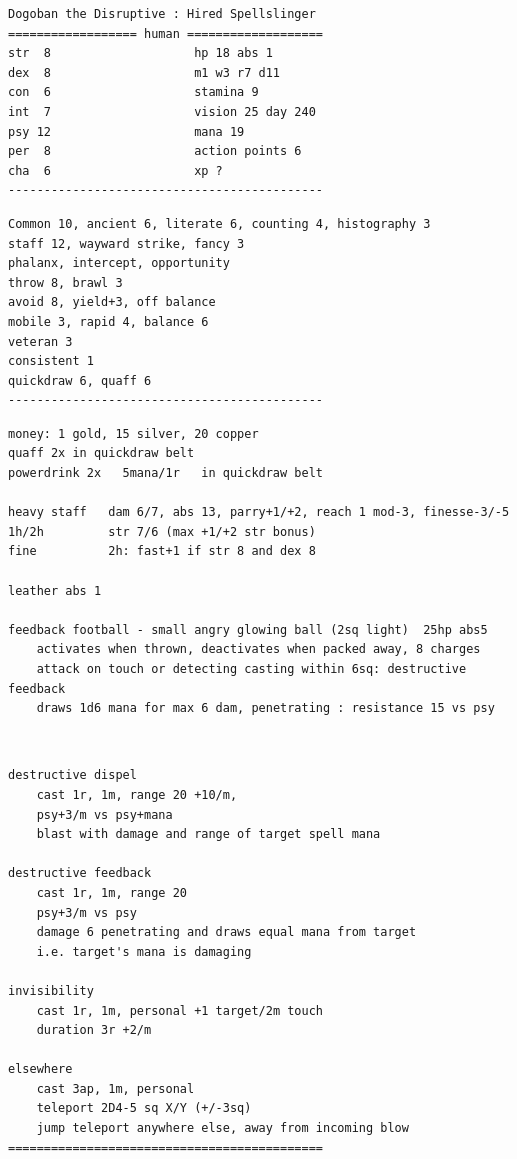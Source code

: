 \small \begin{samepage} \begin{verbatim}
Dogoban the Disruptive : Hired Spellslinger
================== human ===================
str  8                    hp 18 abs 1
dex  8                    m1 w3 r7 d11
con  6                    stamina 9
int  7                    vision 25 day 240
psy 12                    mana 19
per  8                    action points 6
cha  6                    xp ?
--------------------------------------------
\end{verbatim} \goodbreak \begin{verbatim}
Common 10, ancient 6, literate 6, counting 4, histography 3
staff 12, wayward strike, fancy 3
phalanx, intercept, opportunity
throw 8, brawl 3
avoid 8, yield+3, off balance
mobile 3, rapid 4, balance 6
veteran 3
consistent 1
quickdraw 6, quaff 6
--------------------------------------------
\end{verbatim} \goodbreak \begin{verbatim}
money: 1 gold, 15 silver, 20 copper
quaff 2x in quickdraw belt
powerdrink 2x   5mana/1r   in quickdraw belt

heavy staff   dam 6/7, abs 13, parry+1/+2, reach 1 mod-3, finesse-3/-5
1h/2h         str 7/6 (max +1/+2 str bonus)
fine          2h: fast+1 if str 8 and dex 8

leather abs 1

feedback football - small angry glowing ball (2sq light)  25hp abs5
    activates when thrown, deactivates when packed away, 8 charges
    attack on touch or detecting casting within 6sq: destructive feedback
    draws 1d6 mana for max 6 dam, penetrating : resistance 15 vs psy
\end{verbatim} \end{samepage} \ \goodbreak \begin{samepage} \begin{verbatim}
destructive dispel
    cast 1r, 1m, range 20 +10/m, 
    psy+3/m vs psy+mana
    blast with damage and range of target spell mana

destructive feedback
    cast 1r, 1m, range 20
    psy+3/m vs psy
    damage 6 penetrating and draws equal mana from target
    i.e. target's mana is damaging

invisibility
    cast 1r, 1m, personal +1 target/2m touch
    duration 3r +2/m

elsewhere
    cast 3ap, 1m, personal
    teleport 2D4-5 sq X/Y (+/-3sq)
    jump teleport anywhere else, away from incoming blow
============================================
\end{verbatim} \end{samepage} \normalsize
